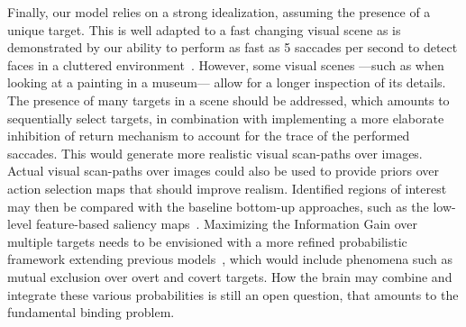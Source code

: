 Finally, our model relies on a strong idealization, assuming the presence of a unique target. This is well adapted to a fast changing visual scene as is demonstrated by our ability to perform as fast as 5 saccades per second to detect faces in a cluttered environment~\cite{Martin18}. However, some visual scenes ---such as when looking at a painting in a museum--- allow for a longer inspection of its details. The presence of many targets in a scene should be addressed, which amounts to sequentially select targets, in combination with implementing a more elaborate inhibition of return mechanism to account for the trace of the performed saccades. This would generate more realistic visual scan-paths over images. Actual visual scan-paths over images could also be used to provide priors over action selection maps that should improve realism. Identified regions of interest may then be compared with the baseline bottom-up approaches, such as the low-level feature-based saliency maps~\cite{Itti01}. Maximizing the Information Gain over multiple targets needs to be envisioned with a more refined probabilistic framework extending previous models~\cite{Friston12}, which would include phenomena such as mutual exclusion over overt and covert targets. How the brain may combine and integrate these various probabilities is still an open question, that amounts to the fundamental binding problem. %
